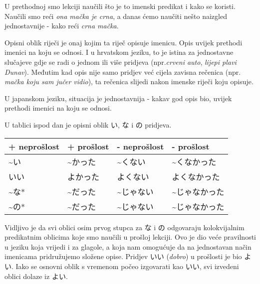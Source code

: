
\author{Tomislav Mamić}

	
	U prethodnoj smo lekciji naučili što je to imenski predikat i kako se koristi. Naučili smo reći \textit{ona mačka je crna}, a danas ćemo naučiti nešto naizgled jednostavnije - kako reći \textit{crna mačka}.
	
	
	Opisni oblik riječi je onaj kojim ta riječ opisuje imenicu. Opis uvijek prethodi imenici na koju se odnosi. I u hrvatskom jeziku, to je istina za jednostavne slučajeve gdje se radi o jednom ili više pridjeva (npr.\textit{crveni auto}, \textit{lijepi plavi Dunav}). Međutim kad opis nije samo pridjev već cijela zavisna rečenica (npr. \textit{mačka koju sam jučer vidio}), ta rečenica slijedi nakon imenske riječi koju opisuje.
	
	U japanskom jeziku, situacija je jednostavnija - kakav god opis bio, uvijek prethodi imenici na koju se odnosi.
	
	U tablici ispod dan je opisni oblik い, な i の pridjeva.
	
	\begin{table}[h]
		\centering
		\begin{tabular}{l l l l}\toprule[2pt]
			+ neprošlost & + prošlost & - neprošlost & - prošlost\\
			\midrule
			\textasciitilde い & \textasciitilde かった & \textasciitilde くない & \textasciitilde くなかった\\
			いい & よかった & よくない & よくなかった\\
			\textasciitilde な* & \textasciitilde だった & \textasciitilde じゃない & \textasciitilde じゃなかった\\
			\textasciitilde の* & \textasciitilde だった & \textasciitilde じゃない & \textasciitilde じゃなかった\\
			\bottomrule[2pt]
		\end{tabular}
	\end{table}

	Vidljivo je da svi oblici osim prvog stupca za な i の odgovaraju kolokvijalnim predikatnim oblicima koje smo naučili u prošloj lekciji. Ovo je dio veće pravilnosti u jeziku koja vrijedi i za glagole, a koja nam omogućuje da na jednostavan način imenicama pridružujemo složene opise. Pridjev いい (\textit{dobro}) u prošlosti je bio よい. Iako se osnovni oblik s vremenom počeo izgovarati kao いい, svi izvedeni oblici dolaze iz よい.
	
